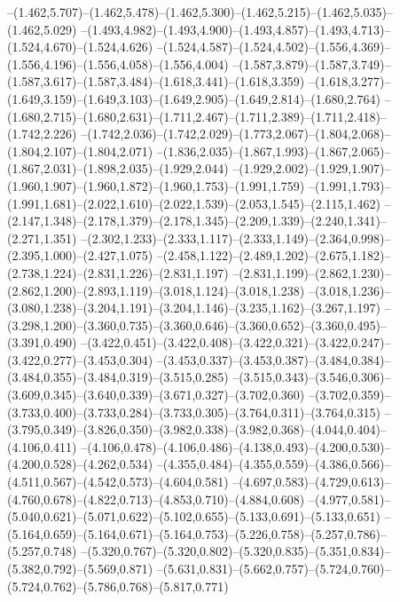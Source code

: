   --(1.462,5.707)--(1.462,5.478)--(1.462,5.300)--(1.462,5.215)--(1.462,5.035)--(1.462,5.029)%
  --(1.493,4.982)--(1.493,4.900)--(1.493,4.857)--(1.493,4.713)--(1.524,4.670)--(1.524,4.626)%
  --(1.524,4.587)--(1.524,4.502)--(1.556,4.369)--(1.556,4.196)--(1.556,4.058)--(1.556,4.004)%
  --(1.587,3.879)--(1.587,3.749)--(1.587,3.617)--(1.587,3.484)--(1.618,3.441)--(1.618,3.359)%
  --(1.618,3.277)--(1.649,3.159)--(1.649,3.103)--(1.649,2.905)--(1.649,2.814)--(1.680,2.764)%
  --(1.680,2.715)--(1.680,2.631)--(1.711,2.467)--(1.711,2.389)--(1.711,2.418)--(1.742,2.226)%
  --(1.742,2.036)--(1.742,2.029)--(1.773,2.067)--(1.804,2.068)--(1.804,2.107)--(1.804,2.071)%
  --(1.836,2.035)--(1.867,1.993)--(1.867,2.065)--(1.867,2.031)--(1.898,2.035)--(1.929,2.044)%
  --(1.929,2.002)--(1.929,1.907)--(1.960,1.907)--(1.960,1.872)--(1.960,1.753)--(1.991,1.759)%
  --(1.991,1.793)--(1.991,1.681)--(2.022,1.610)--(2.022,1.539)--(2.053,1.545)--(2.115,1.462)%
  --(2.147,1.348)--(2.178,1.379)--(2.178,1.345)--(2.209,1.339)--(2.240,1.341)--(2.271,1.351)%
  --(2.302,1.233)--(2.333,1.117)--(2.333,1.149)--(2.364,0.998)--(2.395,1.000)--(2.427,1.075)%
  --(2.458,1.122)--(2.489,1.202)--(2.675,1.182)--(2.738,1.224)--(2.831,1.226)--(2.831,1.197)%
  --(2.831,1.199)--(2.862,1.230)--(2.862,1.200)--(2.893,1.119)--(3.018,1.124)--(3.018,1.238)%
  --(3.018,1.236)--(3.080,1.238)--(3.204,1.191)--(3.204,1.146)--(3.235,1.162)--(3.267,1.197)%
  --(3.298,1.200)--(3.360,0.735)--(3.360,0.646)--(3.360,0.652)--(3.360,0.495)--(3.391,0.490)%
  --(3.422,0.451)--(3.422,0.408)--(3.422,0.321)--(3.422,0.247)--(3.422,0.277)--(3.453,0.304)%
  --(3.453,0.337)--(3.453,0.387)--(3.484,0.384)--(3.484,0.355)--(3.484,0.319)--(3.515,0.285)%
  --(3.515,0.343)--(3.546,0.306)--(3.609,0.345)--(3.640,0.339)--(3.671,0.327)--(3.702,0.360)%
  --(3.702,0.359)--(3.733,0.400)--(3.733,0.284)--(3.733,0.305)--(3.764,0.311)--(3.764,0.315)%
  --(3.795,0.349)--(3.826,0.350)--(3.982,0.338)--(3.982,0.368)--(4.044,0.404)--(4.106,0.411)%
  --(4.106,0.478)--(4.106,0.486)--(4.138,0.493)--(4.200,0.530)--(4.200,0.528)--(4.262,0.534)%
  --(4.355,0.484)--(4.355,0.559)--(4.386,0.566)--(4.511,0.567)--(4.542,0.573)--(4.604,0.581)%
  --(4.697,0.583)--(4.729,0.613)--(4.760,0.678)--(4.822,0.713)--(4.853,0.710)--(4.884,0.608)%
  --(4.977,0.581)--(5.040,0.621)--(5.071,0.622)--(5.102,0.655)--(5.133,0.691)--(5.133,0.651)%
  --(5.164,0.659)--(5.164,0.671)--(5.164,0.753)--(5.226,0.758)--(5.257,0.786)--(5.257,0.748)%
  --(5.320,0.767)--(5.320,0.802)--(5.320,0.835)--(5.351,0.834)--(5.382,0.792)--(5.569,0.871)%
  --(5.631,0.831)--(5.662,0.757)--(5.724,0.760)--(5.724,0.762)--(5.786,0.768)--(5.817,0.771)%
